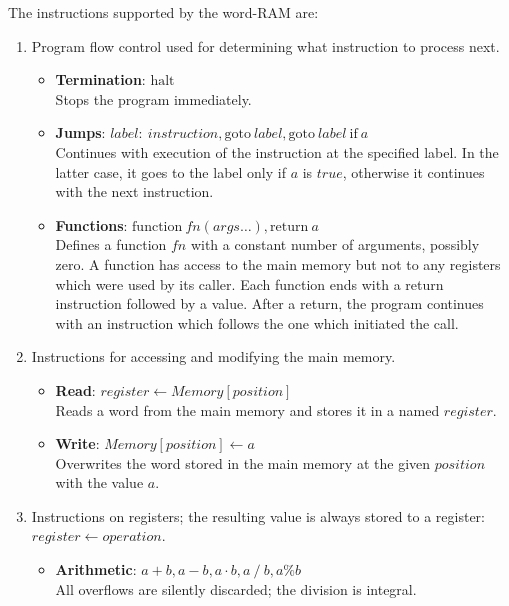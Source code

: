 The instructions supported by the word-RAM are:
\begin{enumerate}
	\item Program flow control used for determining what instruction to process next.
	\begin{itemize}
		\item \textbf{Termination}: $\textrm{halt}$ \\
		Stops the program immediately.
		\item \textbf{Jumps}: $\mathit{label}{:}\ \mathit{instruction}, \textrm{goto}\ \mathit{label}, \textrm{goto}\ \mathit{label}\ \textrm{if}\ a$ \\
		Continues with execution of the instruction at the specified label.
		In the latter case, it goes to the label only if $a$ is $\mathit{true}$, otherwise it continues with the next instruction.
		\item \textbf{Functions}: $\textrm{function}\ \mathit{fn}(\mathit{args}\ldots), \textrm{return}\ a$ \\
		Defines a function $\mathit{fn}$ with a constant number of arguments, possibly zero.
		A function has access to the main memory but not to any registers which were used by its caller.
		Each function ends with a return instruction followed by a value.
		After a return, the program continues with an instruction which follows the one which initiated the call.
	\end{itemize}
	\item Instructions for accessing and modifying the main memory.
	\begin{itemize}
		\item \textbf{Read}: $\mathit{register} \gets \mathit{Memory}[\mathit{position}]$ \\
		Reads a word from the main memory and stores it in a named $\mathit{register}$.
		\item \textbf{Write}: $\mathit{Memory}[\mathit{position}] \gets a$ \\
		Overwrites the word stored in the main memory at the given $position$ with the value $a$.
	\end{itemize}
	\item Instructions on registers; the resulting value is always stored to a register: $\mathit{register} \gets \mathit{operation}$.
	\begin{itemize}
		\item \textbf{Arithmetic}: $a + b, a - b, a \cdot b, a \mathbin{/} b, a \% b$ \\
		All overflows are silently discarded; the division is integral.

\end{itemize}
\end{enumerate}
